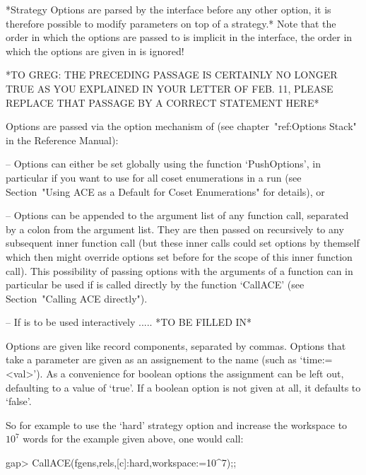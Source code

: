 *Strategy Options are parsed by  the {\GAP} interface before any other
option,  it is therefore  possible to  modify parameters  on top  of a
strategy.*  Note that the  order in  which the  options are  passed to
{\ACE} is  implicit in the interface,  the order in  which the options
are given in {\GAP} is ignored!

*TO  GREG: 
THE PRECEDING PASSAGE IS CERTAINLY  NO LONGER TRUE AS YOU EXPLAINED IN
YOUR  LETTER OF FEB.   11, PLEASE  REPLACE THAT  PASSAGE BY  A CORRECT
STATEMENT HERE*

Options  are   passed  via  the   option  mechanism  of   {\GAP}  (see
chapter~"ref:Options Stack"  in the Reference Manual):  

\beginlist

\item{--}  Options  can either  be  set  globally  using the  function
`PushOptions', in particular  if you want to use  {\ACE} for all coset
enumerations in a {\GAP} run  (see Section~"Using ACE as a Default for
Coset Enumerations" for details), or


\item{--} Options can be appended to the argument list of any function
call,  separated by a  colon from  the argument  list.  They  are then
passed on recursively to any subsequent inner function call (but these
inner calls  could set options  by themself which then  might override
options set  before for the scope  of this inner  function call). This
possibility of passing options with the arguments of a function can in
particular  be used  if  {\ACE}  is called  directly  by the  function
`CallACE' (see Section~"Calling ACE directly").

\item{--} If {\ACE} is to be used interactively .....
*TO BE FILLED IN*

\endlist

Options  are  given  like  record  components,  separated  by  commas.
Options that take a parameter are  given as an assignement to the name
(such  as `time:=<val>').  As  a convenience  for boolean  options the
assignment can  be left out, defaulting  to a value of  `true'.  If a
boolean option is not given at  all, it defaults to `false'. 


So  for example to  use the  `hard' strategy  option and  increase the
workspace to $10^7$ words for the example given above, one would call:

\begintt
gap> CallACE(fgens,rels,[c]:hard,workspace:=10^7);;
\endtt

